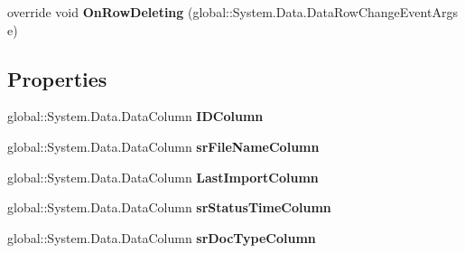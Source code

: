\begin{DoxyCompactItemize}
\item 
override void {\bfseries On\+Row\+Deleting} (global\+::\+System.\+Data.\+Data\+Row\+Change\+Event\+Args e)\hypertarget{class_products_1_1_data_1_1ds_sage_1_1_david_item_data_table_a1ae2c4ad915adec88e3b91458c73aa39}{}\label{class_products_1_1_data_1_1ds_sage_1_1_david_item_data_table_a1ae2c4ad915adec88e3b91458c73aa39}

\end{DoxyCompactItemize}
\subsection*{Properties}
\begin{DoxyCompactItemize}
\item 
global\+::\+System.\+Data.\+Data\+Column {\bfseries I\+D\+Column}\hypertarget{class_products_1_1_data_1_1ds_sage_1_1_david_item_data_table_aeb75ad514021d47f21e1afdd74d7d97b}{}\label{class_products_1_1_data_1_1ds_sage_1_1_david_item_data_table_aeb75ad514021d47f21e1afdd74d7d97b}

\item 
global\+::\+System.\+Data.\+Data\+Column {\bfseries sr\+File\+Name\+Column}\hypertarget{class_products_1_1_data_1_1ds_sage_1_1_david_item_data_table_a5a154d17929f7c1cab991c864fb230a3}{}\label{class_products_1_1_data_1_1ds_sage_1_1_david_item_data_table_a5a154d17929f7c1cab991c864fb230a3}

\item 
global\+::\+System.\+Data.\+Data\+Column {\bfseries Last\+Import\+Column}\hypertarget{class_products_1_1_data_1_1ds_sage_1_1_david_item_data_table_a168fb04f5d4dd3f46f774089500289c3}{}\label{class_products_1_1_data_1_1ds_sage_1_1_david_item_data_table_a168fb04f5d4dd3f46f774089500289c3}

\item 
global\+::\+System.\+Data.\+Data\+Column {\bfseries sr\+Status\+Time\+Column}\hypertarget{class_products_1_1_data_1_1ds_sage_1_1_david_item_data_table_aa1b8596c7ba4ec9c3f87cdaf6b14a947}{}\label{class_products_1_1_data_1_1ds_sage_1_1_david_item_data_table_aa1b8596c7ba4ec9c3f87cdaf6b14a947}

\item 
global\+::\+System.\+Data.\+Data\+Column {\bfseries sr\+Doc\+Type\+Column}\hypertarget{class_products_1_1_data_1_1ds_sage_1_1_david_item_data_table_a550cbcaad0eda62310f41b1c7c923def}{}\label{class_products_1_1_data_1_1ds_sage_1_1_david_item_data_table_a550cbcaad0eda62310f41b1c7c923def}


\end{DoxyCompactItemize}
